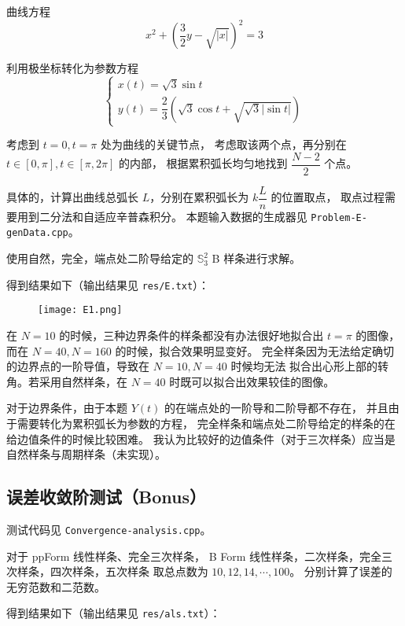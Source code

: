 \documentclass[lang=cn,a4paper,newtx,bibend=bibtex]{elegantpaper}
\newcommand{\SBB}{\mathbb{S}}
\begin{document}
曲线方程
\[x^2 + \left(\dfrac32 y - \sqrt{|x|}\right)^2 = 3\]

利用极坐标转化为参数方程
\[\begin{cases}x(t) = \sqrt{3} \sin t \\
  y(t) = \dfrac23 \left(\sqrt{3} \cos t + \sqrt{\sqrt{3} |\sin t|}\right)
\end{cases}\]

考虑到 $t = 0, t = \pi$ 处为曲线的关键节点，
考虑取该两个点，再分别在 $t\in[0, \pi], t\in[\pi, 2\pi]$ 的内部，
根据累积弧长均匀地找到 $\dfrac{N-2}2$ 个点。

具体的，计算出曲线总弧长 $L$，分别在累积弧长为 $k\dfrac{L}{n}$ 的位置取点，
取点过程需要用到二分法和自适应辛普森积分。
本题输入数据的生成器见 \lstinline{Problem-E-genData.cpp}。

使用自然，完全，端点处二阶导给定的 $\SBB_3^2$ B 样条进行求解。

得到结果如下（输出结果见 \lstinline{res/E.txt}）：

\begin{figure}[H]
  \centering
  \texttt{[image: E1.png]}
\end{figure}

在 $N=10$ 的时候，三种边界条件的样条都没有办法很好地拟合出 $t=\pi$ 的图像，
而在 $N=40,N=160$ 的时候，拟合效果明显变好。
完全样条因为无法给定确切的边界点的一阶导值，导致在 $N=10, N=40$ 时候均无法
拟合出心形上部的转角。若采用自然样条，在 $N=40$ 时既可以拟合出效果较佳的图像。


对于边界条件，由于本题 $Y(t)$ 的在端点处的一阶导和二阶导都不存在，
并且由于需要转化为累积弧长为参数的方程，
完全样条和端点处二阶导给定的样条的在给边值条件的时候比较困难。
我认为比较好的边值条件（对于三次样条）应当是自然样条与周期样条（未实现）。


\subsection{误差收敛阶测试（Bonus）}

测试代码见 \lstinline{Convergence-analysis.cpp}。

对于 ppForm 线性样条、完全三次样条，
B Form 线性样条，二次样条，完全三次样条，四次样条，五次样条
取总点数为 $10, 12, 14, \cdots, 100$。
分别计算了误差的无穷范数和二范数。

得到结果如下（输出结果见 \lstinline{res/als.txt}）：
\end{document}

